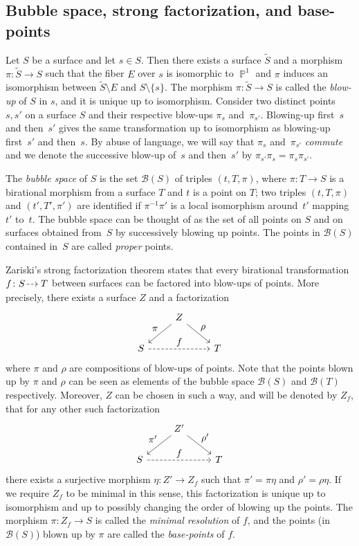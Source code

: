 \documentclass[JEP,XML,SOM,Unicode, NoEqCountersInSection,published]{cedram}
\newcommand{\dradpl}{{\hspace*{-2.5mm}\begin{tikzcd}[ampersand replacement=\&,column sep = scriptsize]\mbox{}\ar[r,dashed]\&\mbox{}\end{tikzcd}\hspace*{-2.5mm}}}
\newcommand{\dratst}{{\hspace*{-2.5mm}\begin{tikzcd}[ampersand replacement=\&,column sep = small]\mbox{}\ar[r,dashed]\&\mbox{}\end{tikzcd}\hspace*{-2mm}}}
\let\drascst\dratst
\newcommand{\dra}{\mathchoice{\dradpl}{\dratst}{\drascst}{\drascst}}
\let\dashrightarrow\dra
\let\ts\textstyle
\newcommand{\p}{\operatorname{\mathbb{P}}}\let\P\p
\newcommand{\B}{\mathcal{B}}
\theoremstyle{plain}
\theoremstyle{definition}
\begin{document}
\subsection{Bubble space, strong factorization, and base-points}
Let $S$ be a surface and let $s\in S$. Then there exists a surface $\tilde S$ and a morphism $\pi\colon\tilde S\to S$ such that the fiber $E$ over $s$ is isomorphic to $\p^1$ and $\pi$ induces an isomorphism between $\tilde S\setminus E$ and $S\setminus\{s\}$. The morphism $\pi\colon \tilde S\to S$ is called the \emph{blow-up} of $S$ in $s$, and it is unique up to isomorphism. Consider two distinct points $s,s'$ on a surface $S$ and their respective blow-ups $\pi_{s}$ and~$\pi_{s'}$. Blowing-up first~$s$ and then~$s'$ gives the same transformation up to isomorphism as blowing-up first~$s'$ and then~$s$. By abuse of language, we will say that $\pi_s$ and~$\pi_{s'}$ \emph{commute} and we denote the successive blow-up of~$s$ and then~$s'$ by $\pi_{s'}\pi_s=\pi_s\pi_{s'}$.

The \emph{bubble space} of $S$ is the set $\B(S)$ of triples $(t,T,\pi)$, where $\pi\colon T\to S$ is a birational morphism from a surface $T$ and $t$ is a point on $T$; two triples $(t,T,\pi)$ and $(t', T',\pi')$ are identified if $\pi^{-1}\pi'$ is a local isomorphism around~$t'$ mapping~$t'$ to~$t$. The bubble space can be thought of as the set of all points on $S$ and on surfaces obtained from~$S$ by successively blowing up points. The points in $\B(S)$ contained in~$S$ are called \emph{proper} points.

Zariski's strong factorization theorem states that every birational transformation $f\colon S\dashrightarrow T$ between surfaces can be factored into blow-ups of points. More precisely, there exists a surface $Z$ and a factorization
\[
\begin{tikzcd}
& Z \arrow[ld, "\ts\pi"'] \arrow[rd, "\ts\rho"] & \\
S \arrow[rr, "\ts f", dashed] & & T
\end{tikzcd}
\]
where $\pi$ and $\rho$ are compositions of blow-ups of points. Note that the points blown up by $\pi$ and $\rho$ can be seen as elements of the bubble space $\B( S)$ and $\B( T)$ respectively. Moreover, $Z$ can be chosen in such a way, and will be denoted by $Z_f$, that for any other such factorization
\[
\begin{tikzcd}
& Z' \arrow[ld, "\ts\pi'"'] \arrow[rd, "\ts\rho'"] & \\
S \arrow[rr, "\ts f", dashed] & & T
\end{tikzcd}
\]
there exists a surjective morphism $\eta\colon Z'\to Z_f$ such that $\pi'=\pi\eta$ and $\rho'=\rho\eta$. If we require $Z_f$ to be minimal in this sense, this factorization is unique up to isomorphism and up to possibly changing the order of blowing up the points. {The morphism $\pi\colon Z_f\to S$ is called the \emph{minimal resolution} of $f$}, and the points (in~$\B(S)$) blown up by $\pi$ are called the \emph{base-points} of $f$.
\end{document}
